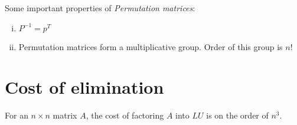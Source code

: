 \documentclass{tufte-handout}
\begin{document}
\newthought{}Some important properties of \emph{Permutation matrices}:
\begin{enumerate}[(i)]
\item $P^{-1} = p^T$
\item Permutation matrices form a multiplicative group. Order of this
  group is $n!$
\end{enumerate}

\section{Cost of elimination}
For an $n \times n$ matrix $A$, the cost of factoring $A$ into $LU$ is
on the order of $n^3$.
\end{document}

